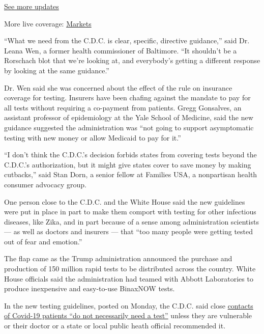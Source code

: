 \href{https://www.nytimes3xbfgragh.onion/2020/09/11/world/covid-19-coronavirus.html?action=click\&pgtype=Article\&state=default\&region=MAIN_CONTENT_1\&context=storylines_live_updates}{See
more updates}

More live coverage:
\href{https://www.nytimes3xbfgragh.onion/live/2020/09/11/business/stock-market-today-coronavirus?action=click\&pgtype=Article\&state=default\&region=MAIN_CONTENT_1\&context=storylines_live_updates}{Markets}

``What we need from the C.D.C. is clear, specific, directive guidance,''
said Dr. Leana Wen, a former health commissioner of Baltimore. ``It
shouldn't be a Rorschach blot that we're looking at, and everybody's
getting a different response by looking at the same guidance.''

Dr. Wen said she was concerned about the effect of the rule on insurance
coverage for testing. Insurers have been chafing against the mandate to
pay for all tests without requiring a co-payment from patients. Gregg
Gonsalves, an assistant professor of epidemiology at the Yale School of
Medicine, said the new guidance suggested the administration was ``not
going to support asymptomatic testing with new money or allow Medicaid
to pay for it.''

``I don't think the C.D.C.'s decision forbids states from covering tests
beyond the C.D.C.'s authorization, but it might give states cover to
save money by making cutbacks,'' said Stan Dorn, a senior fellow at
Families USA, a nonpartisan health consumer advocacy group.

One person close to the C.D.C. and the White House said the new
guidelines were put in place in part to make them comport with testing
for other infectious diseases, like Zika, and in part because of a sense
among administration scientists --- as well as doctors and insurers ---
that ``too many people were getting tested out of fear and emotion.''

The flap came as the Trump administration announced the purchase and
production of 150 million rapid tests to be distributed across the
country. White House officials said the administration had teamed with
Abbott Laboratories to produce inexpensive and easy-to-use BinaxNOW
tests.

In the new testing guidelines, posted on Monday, the C.D.C. said close
\href{https://www.nytimes3xbfgragh.onion/2020/08/25/health/covid-19-testing-cdc.html}{contacts
of Covid-19 patients ``do not necessarily need a test''} unless they are
vulnerable or their doctor or a state or local public heath official
recommended it.

